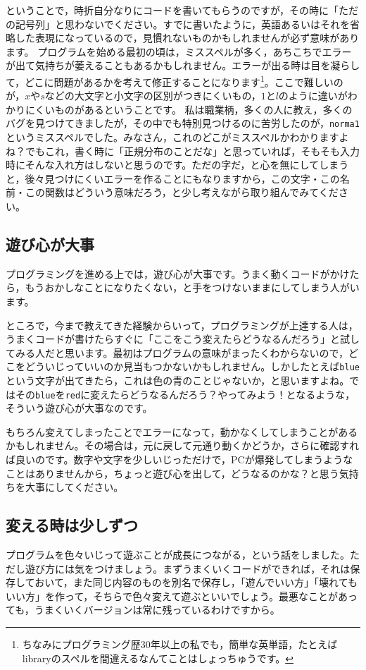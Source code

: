 \documentclass{ltjsbook}
\begin{document}
ということで，時折自分なりにコードを書いてもらうのですが，その時に「ただの記号列」と思わないでください。すでに書いたように，英語あるいはそれを省略した表現になっているので，見慣れないものかもしれませんが必ず意味があります。
プログラムを始める最初の頃は，ミススペルが多く，あちこちでエラーが出て気持ちが萎えることもあるかもしれません。エラーが出る時は目を凝らして，どこに問題があるかを考えて修正することになります\footnote{ちなみにプログラミング歴30年以上の私でも，簡単な英単語，たとえばlibraryのスペルを間違えるなんてことはしょっちゅうです。}。ここで難しいのが，$x$や$s$などの大文字と小文字の区別がつきにくいもの，$1$と$l$のように違いがわかりにくいものがあるということです。
私は職業柄，多くの人に教え，多くのバグを見つけてきましたが，その中でも特別見つけるのに苦労したのが，\texttt{norma1}というミススペルでした。みなさん，これのどこがミススペルかわかりますよね？でもこれ，書く時に「正規分布のことだな」と思っていれば，そもそも入力時にそんな入れ方はしないと思うのです。ただの字だ，と心を無にしてしまうと，後々見つけにくいエラーを作ることにもなりますから，この文字・この名前・この関数はどういう意味だろう，と少し考えながら取り組んでみてください。

\subsection{遊び心が大事}
プログラミングを進める上では，遊び心が大事です。うまく動くコードがかけたら，もうおかしなことになりたくない，と手をつけないままにしてしまう人がいます。

ところで，今まで教えてきた経験からいって，プログラミングが上達する人は，うまくコードが書けたらすぐに「ここをこう変えたらどうなるんだろう」と試してみる人だと思います。最初はプログラムの意味がまったくわからないので，どこをどういじっていいのか見当もつかないかもしれません。しかしたとえば\texttt{blue}という文字が出てきたら，これは色の青のことじゃないか，と思いますよね。ではその\texttt{blue}を\texttt{red}に変えたらどうなるんだろう？やってみよう！となるような，そういう遊び心が大事なのです。

もちろん変えてしまったことでエラーになって，動かなくしてしまうことがあるかもしれません。その場合は，元に戻して元通り動くかどうか，さらに確認すれば良いのです。数字や文字を少しいじっただけで，PCが爆発してしまうようなことはありませんから，ちょっと遊び心を出して，どうなるのかな？と思う気持ちを大事にしてください。

\subsection{変える時は少しずつ}
プログラムを色々いじって遊ぶことが成長につながる，という話をしました。ただし遊び方には気をつけましょう。まずうまくいくコードができれば，それは保存しておいて，また同じ内容のものを別名で保存し，「遊んでいい方」「壊れてもいい方」を作って，そちらで色々変えて遊ぶといいでしょう。最悪なことがあっても，うまくいくバージョンは常に残っているわけですから。
\end{document}
